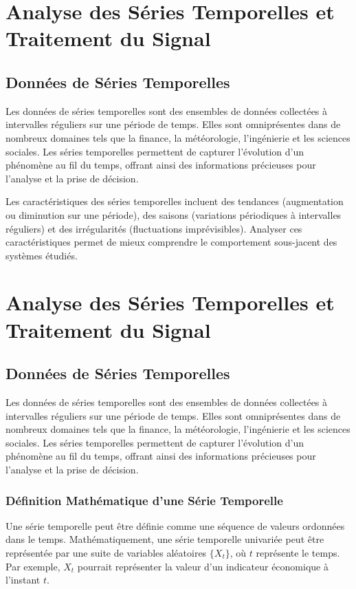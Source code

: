 \section*{Analyse des Séries Temporelles et Traitement du Signal}

\subsection*{Données de Séries Temporelles}

Les données de séries temporelles sont des ensembles de données collectées à
intervalles réguliers sur une période de temps. Elles sont omniprésentes dans
de nombreux domaines tels que la finance, la météorologie, l'ingénierie et les
sciences sociales. Les séries temporelles permettent de capturer l'évolution
d'un phénomène au fil du temps, offrant ainsi des informations précieuses pour
l'analyse et la prise de décision.

Les caractéristiques des séries temporelles incluent des tendances
(augmentation ou diminution sur une période), des saisons (variations
périodiques à intervalles réguliers) et des irrégularités (fluctuations
imprévisibles). Analyser ces caractéristiques permet de mieux comprendre le
comportement sous-jacent des systèmes étudiés.

\section*{Analyse des Séries Temporelles et Traitement du Signal}

\subsection*{Données de Séries Temporelles}

Les données de séries temporelles sont des ensembles de données collectées à
intervalles réguliers sur une période de temps. Elles sont omniprésentes dans
de nombreux domaines tels que la finance, la météorologie, l'ingénierie et les
sciences sociales. Les séries temporelles permettent de capturer l'évolution
d'un phénomène au fil du temps, offrant ainsi des informations précieuses pour
l'analyse et la prise de décision.

\subsubsection*{Définition Mathématique d'une Série Temporelle}

Une série temporelle peut être définie comme une séquence de valeurs ordonnées
dans le temps. Mathématiquement, une série temporelle univariée peut être
représentée par une suite de variables aléatoires $\{X_t\}$, où $t$ représente
le temps. Par exemple, $X_t$ pourrait représenter la valeur d'un indicateur
économique à l'instant $t$.

